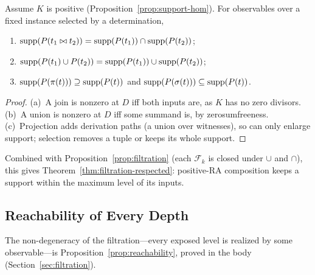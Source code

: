 \begin{proposition}
  \label{prop:propagation}
  Assume $K$ is positive (Proposition~\ref{prop:support-hom}). For observables
  over a fixed instance selected by a determination,
  \begin{enumerate}[nosep,label=(\alph*)]
    \item $\operatorname{supp}(P(t_1 \bowtie t_2)) = \operatorname{supp}(P(t_1)) \cap \operatorname{supp}(P(t_2))$;
    \item $\operatorname{supp}(P(t_1) \cup P(t_2)) = \operatorname{supp}(P(t_1)) \cup \operatorname{supp}(P(t_2))$;
    \item $\operatorname{supp}(P(\pi(t))) \supseteq \operatorname{supp}(P(t))$ and
          $\operatorname{supp}(P(\sigma(t))) \subseteq \operatorname{supp}(P(t))$.
  \end{enumerate}
\end{proposition}
\begin{proof}
  (a)~A join is nonzero at $D$ iff both inputs are, as $K$ has no zero
  divisors. (b)~A union is nonzero at $D$ iff some summand is, by
  zerosumfreeness. (c)~Projection adds derivation paths (a union over
  witnesses), so can only enlarge support; selection removes a tuple or keeps
  its whole support.
\end{proof}

\noindent
Combined with Proposition~\ref{prop:filtration} (each $\mathcal{F}_k$ is closed
under $\cup$ and $\cap$), this gives Theorem~\ref{thm:filtration-respected}:
positive-RA composition keeps a support within the maximum level of its
inputs.

\subsection{Reachability of Every Depth}
\label{app:reachability}

The non-degeneracy of the filtration---every exposed level is realized by some
observable---is Proposition~\ref{prop:reachability}, proved in the body
(Section~\ref{sec:filtration}).
